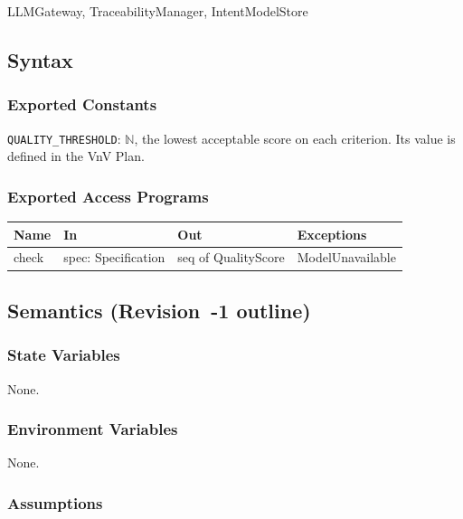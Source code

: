 \documentclass[12pt, titlepage]{article}
\begin{document}
LLMGateway, TraceabilityManager, IntentModelStore

\subsection{Syntax}

\subsubsection{Exported Constants}

\texttt{QUALITY\_THRESHOLD}: $\mathbb{N}$, the lowest acceptable score on each
criterion. Its value is defined in the VnV Plan.

\subsubsection{Exported Access Programs}

\begin{center}
\small
\begin{tabular}{>{\raggedright\arraybackslash}p{3.7cm} >{\raggedright\arraybackslash}p{3.8cm} >{\raggedright\arraybackslash}p{3.6cm} >{\raggedright\arraybackslash}p{3.7cm}}
\hline
\textbf{Name} & \textbf{In} & \textbf{Out} & \textbf{Exceptions} \\
\hline
check & spec: Specification & seq of QualityScore & ModelUnavailable \\
\hline
\end{tabular}
\end{center}

\subsection{Semantics (Revision~-1 outline)}

\subsubsection{State Variables}

None.

\subsubsection{Environment Variables}

None.

\subsubsection{Assumptions}
\end{document}

